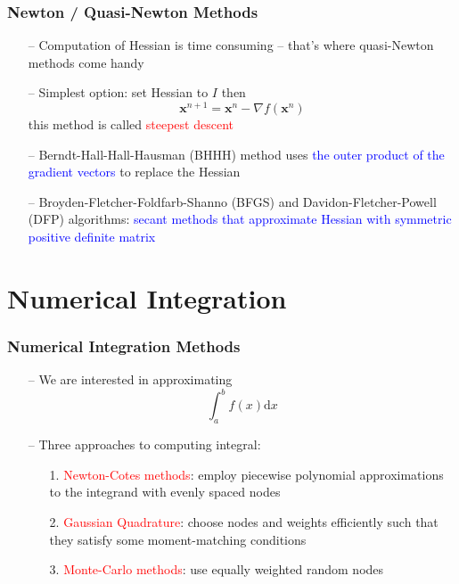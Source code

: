\documentclass[aspectratio=169, 11pt]{beamer}
\begin{document}
\begin{frame}
\frametitle{Newton / Quasi-Newton Methods}
  \begin{itemize}
    \item[--] Computation of Hessian is time consuming -- that's where quasi-Newton methods come handy
    \bigskip
    \item[--] Simplest option: set Hessian to $I$ then
    \[
      \mathbf{x}^{n+1}=\mathbf{x}^{n}-\nabla f\left(\mathbf{x}^{n}\right)
    \]
    this method is called \textcolor{red}{steepest descent}
    \bigskip
    \item[--] Berndt-Hall-Hall-Hausman (BHHH) method uses \textcolor{blue}{the outer product of the gradient vectors} to replace the Hessian
    \item[--] Broyden-Fletcher-Foldfarb-Shanno (BFGS) and Davidon-Fletcher-Powell (DFP) algorithms: \textcolor{blue}{secant methods that approximate Hessian with symmetric positive definite matrix}
  \end{itemize}
\end{frame}

\section{Numerical Integration}

\begin{frame}
\frametitle{Numerical Integration Methods}
  \begin{itemize}
    \item[--] We are interested in approximating
    \[
      \int_{a}^{b}f\left(x\right)\mathrm{d}x
    \]
    \bigskip
    \item[--] Three approaches to computing integral:
    \begin{itemize}
      \medskip
      \item[1.] \textcolor{red}{Newton-Cotes methods}: employ piecewise polynomial approximations to the integrand with evenly spaced nodes
      \medskip
      \item[2.] \textcolor{red}{Gaussian Quadrature}: choose nodes and weights efficiently such that they satisfy some moment-matching conditions
      \medskip
      \item[3.] \textcolor{red}{Monte-Carlo methods}: use equally weighted random nodes
    \end{itemize}
  \end{itemize}
\end{frame}
\end{document}

